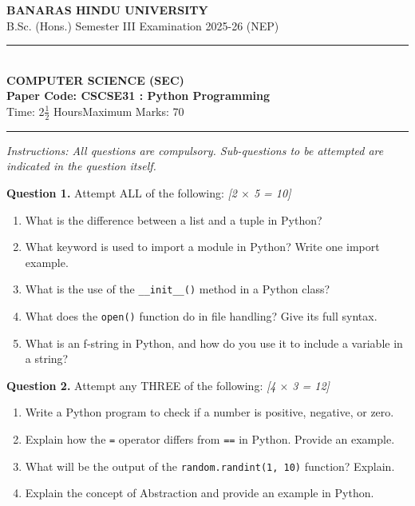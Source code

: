 \documentclass[11pt,a4paper]{article}
\newcommand{\pts}[1]{\hfill \textit{[#1]}}
\begin{document}
\begin{center}
  {\large\bfseries BANARAS HINDU UNIVERSITY}\\[2pt]
  {\normalsize B.Sc. (Hons.) Semester III Examination 2025-26 (NEP)}\\[6pt]
  \rule{0.8\linewidth}{0.5pt}\\[6pt]
  {\large\bfseries COMPUTER SCIENCE (SEC)}\\[4pt]
  {\large\bfseries Paper Code: CSCSE31 : Python Programming}\\[4pt]
  {\normalsize Time: 2$\frac{1}{2}$ Hours\hfill Maximum Marks: 70}
\end{center}

\rule{\linewidth}{0.4pt}

\smallskip

\noindent \textit{Instructions: All questions are compulsory. Sub-questions to be attempted are indicated in the question itself.}

\bigskip

\noindent \textbf{Question 1.} Attempt ALL of the following: \pts{2 $\times$ 5 = 10}
\begin{enumerate}[label=\alph*.]
  \item What is the difference between a list and a tuple in Python?
  \item What keyword is used to import a module in Python? Write one import example.
  \item What is the use of the \texttt{\_\_init\_\_()} method in a Python class?
  \item What does the \texttt{open()} function do in file handling? Give its full syntax.
  \item What is an f-string in Python, and how do you use it to include a variable in a string?
\end{enumerate}

\bigskip

\noindent \textbf{Question 2.} Attempt any THREE of the following: \pts{4 $\times$ 3 = 12}
\begin{enumerate}[label=\alph*.]
  \item Write a Python program to check if a number is positive, negative, or zero.
  \item Explain how the \texttt{=} operator differs from \texttt{==} in Python. Provide an example.
  \item What will be the output of the \texttt{random.randint(1, 10)} function? Explain.
  \item Explain the concept of Abstraction and provide an example in Python.
\end{enumerate}
\end{document}
